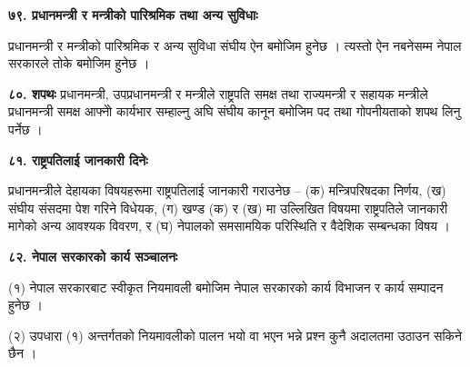 \textbf{७९. प्रधानमन्त्री र मन्त्रीको पारिश्रमिक तथा अन्य सुविधाः}

प्रधानमन्त्री र मन्त्रीको पारिश्रमिक र अन्य सुविधा संघीय ऐन बमोजिम हुनेछ । त्यस्तो ऐन नबनेसम्म नेपाल सरकारले तोके बमोजिम हुनेछ ।

\textbf{८०. शपथः} प्रधानमन्त्री, उपप्रधानमन्त्री र मन्त्रीले राष्ट्रपति समक्ष तथा राज्यमन्त्री र सहायक मन्त्रीले प्रधानमन्त्री समक्ष आफ्नोे कार्यभार सम्हाल्नु अघि संघीय कानून बमोजिम पद तथा गोपनीयताको शपथ लिनु पर्नेछ ।

\textbf{८१. राष्ट्रपतिलाई जानकारी दिनेः}

प्रधानमन्त्रीले देहायका विषयहरूमा राष्ट्रपतिलाई जानकारी गराउनेछ –
(क) मन्त्रिपरिषदका निर्णय,
(ख) संघीय संसदमा पेश गरिने विधेयक,
(ग) खण्ड (क) र (ख) मा उल्लिखित विषयमा राष्ट्रपतिले जानकारी मागेको अन्य आवश्यक विवरण, र
(घ) नेपालको समसामयिक परिस्थिति र वैदेशिक सम्बन्धका विषय ।

\textbf{८२. नेपाल सरकारको कार्य सञ्चालनः}

(१) नेपाल सरकारबाट स्वीकृत नियमावली बमोजिम नेपाल सरकारको कार्य विभाजन र कार्य सम्पादन हुनेछ ।

(२) उपधारा (१) अन्तर्गतको नियमावलीको पालन भयो वा भएन भन्ने प्रश्न कुनै अदालतमा उठाउन सकिने छैन ।